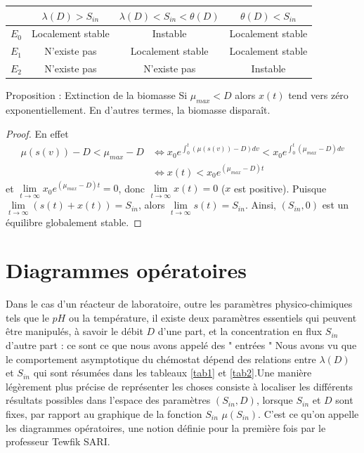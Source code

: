 \documentclass[12pt,a4paper]{report}%
\newcounter{proposition}[section] %
\newenvironment{Proposition}[2][]
  {\refstepcounter{proposition}%
  \begin{bclogo}[
    logo=\bcplume,
    couleur=aliceblue,
    arrondi=0.1,
    barre = snake ,
    couleurBord=white,#1]{Proposition \theproposition: #2}
  }
  {\end{bclogo}}
\newcounter{Prop}[section] %
\begin{document}
\begin{center}
    \begin{tabular}{|c|c|c|c|}
        \hline
        \rowcolor{lightgray}
        & $\lambda(D) > S_{in}$ & $\lambda(D) < S_{in} < \theta(D)$ & $\theta(D) < S_{in}$ \\
        \hline \hline
        $E_0$ & Localement stable & Instable & Localement stable \\
        \hline 
       $E_1$ & N'existe pas & Localement stable & Localement stable \\
        \hline
        $E_2$ & N'existe pas & N'existe pas & Instable \\
        \hline
    \end{tabular}
\label{tab2}
\end{center}
\begin{Proposition}{ Extinction de la biomasse}\label{rextinction}
Si $\mu_{max}<D$ alors $x(t)$ tend vers zéro exponentiellement. En d’autres termes, la biomasse disparaît.



\end{Proposition}
\begin{proof}
En effet 
$$
\begin{aligned}
	\mu(s(v))-D<\mu_{max}-D &\Leftrightarrow x_0 e^{\int_0^t(\mu(s(v))-D)dv}<x_0e^{\int_0^t(\mu_{max}-D)dv}\\
	&\Leftrightarrow x(t)<x_0e^{(\mu_{max}-D)t}
\end{aligned}
$$
et $\lim\limits_{t \rightarrow \infty} x_0 e^{(\mu_{max} - D)t} = 0$, donc $\lim\limits_{t \rightarrow \infty} x(t) = 0$ ($x$ est positive). Puisque $\lim\limits_{t \rightarrow \infty} (s(t) + x(t)) = S_{in}$, alors $\lim\limits_{t \rightarrow \infty} s(t) = S_{in}$. Ainsi, $(S_{in}, 0)$ est un équilibre globalement stable.
\end{proof}

\section{Diagrammes opératoires}
Dans le cas d'un réacteur de laboratoire, outre les paramètres physico-chimiques tels que le $pH$ ou la température, il existe deux paramètres essentiels qui peuvent être manipulés, à savoir le débit $D$ d'une part, et la concentration en flux $S_{in}$ d'autre part : ce sont ce que nous avons appelé des " entrées " Nous avons vu que le comportement asymptotique du chémostat dépend des relations entre $\lambda(D)$ et $S_{in}$ qui sont résumées dans les tableaux \ref{tab1} et \ref{tab2}.Une manière légèrement plus précise de représenter les choses consiste à localiser les différents résultats possibles dans l’espace des paramètres $(S_{in}, D)$, lorsque $S_{in}$ et $D$ sont fixes, par rapport au graphique de la fonction $S_{in}$ $\mu(S_{in})$. C’est ce qu’on appelle les diagrammes opératoires, une notion définie pour la première fois par le professeur Tewfik SARI.
\end{document}
